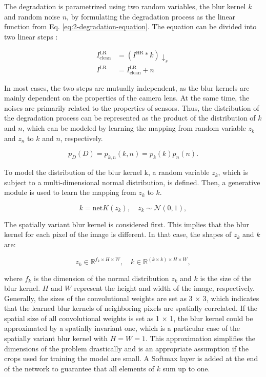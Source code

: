     
    The degradation is parametrized using two random variables, the blur kernel $k$ and random noise $n$, by formulating the degradation process as the linear function from Eq. \ref{eq:2-degradation-equation}.
    The equation can be divided into two linear steps \cite{zhu2020unpaired}: 

    \begin{equation}
        \begin{aligned}
                I^{\text{LR}}_{\text{clean}} &= (I^{\text{HR}} * k) \downarrow_s \\
                I^{\text{LR}} &= I^{\text{LR}}_{\text{clean}} + n
        \end{aligned}
    \end{equation}
    
    In most cases, the two steps are mutually independent, as the blur kernels are mainly dependent on the properties of the camera lens. At the same time, the noises are primarily related to the properties of sensors. 
    Thus, the distribution of the degradation process can be represented as the product of the distribution of $k$ and $n$, which can be modeled by learning the mapping from random variable $z_k$ and $z_n$ to $k$ and $n$, respectively.


    \begin{equation}
        p_{D}(D) = p_{k,n}(k, n) = p_{k}(k)p_{n}(n).
    \end{equation}

    To model the distribution of the blur kernel k, a random variable $z_k$, which is subject to a multi-dimensional normal distribution, is defined. 
    Then, a generative module is used to learn the mapping from $z_k$ to $k$. 

    \begin{equation}
        k = \text{net}K(z_k), \quad z_k \sim \mathcal{N}(0,1),
    \end{equation}

    The spatially variant blur kernel is considered first. This implies that the blur kernel for each pixel of the image is different. In that case, the shapes of $z_k$ and $k$ are:

    \begin{equation}
        z_k \in \mathbb{R}^{f_k \times H \times W}, \quad k \in \mathbb{R}^{(k \times k) \times H \times W},
    \end{equation}

    where $f_k$ is the dimension of the normal distribution $z_k$ and $k$ is the size of the blur kernel. $H$ and $W$ represent the height and width of the image, respectively.
    Generally, the sizes of the convolutional weights are set as 3 × 3, which indicates that the learned blur kernels of neighboring pixels are spatially correlated.
    If the spatial size of all convolutional weights is set as 1 × 1, the blur kernel could be approximated by a spatially invariant one, which is a particular case of the spatially variant blur kernel with $H = W = 1$.
    This approximation simplifies the dimensions of the problem drastically and is an appropriate assumption if the crops used for training the model are small.
    A Softmax layer is added at the end of the network to guarantee that all elements of $k$ sum up to one.
    
